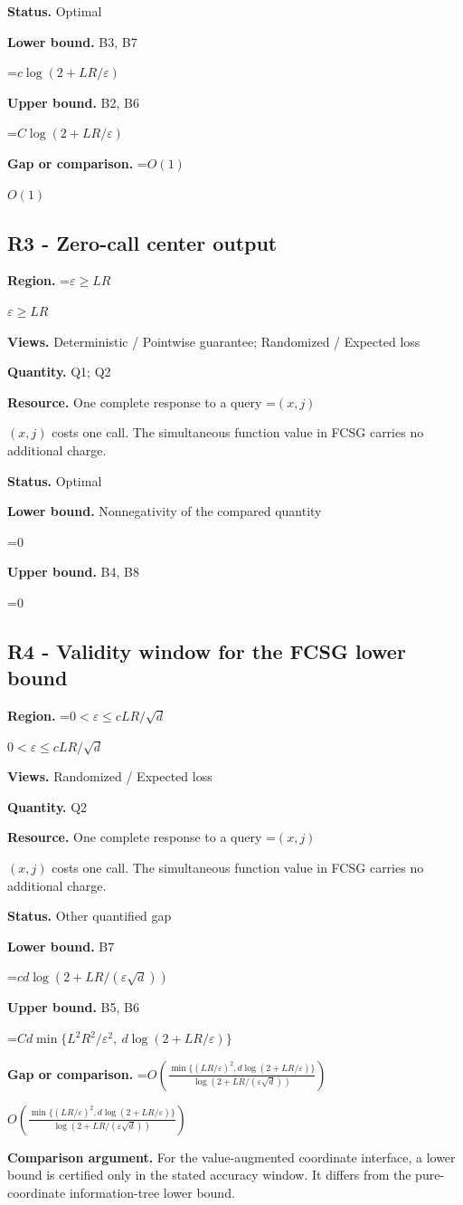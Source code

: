 \documentclass[10pt,a4paper]{article}
\newcommand{\AtlasMath}[1]{\par\begingroup\centering\setbox0=\hbox{$\displaystyle #1$}\ifdim\wd0>1.4\linewidth\typeout{ATLAS WIDE FORMULA: \the\wd0}\fi\ifdim\wd0>\linewidth\resizebox{\linewidth}{!}{\box0}\else\box0\fi\par\endgroup}
\newcommand{\AtlasInlineMath}[1]{\begingroup\setbox0=\hbox{$#1$}\ifdim\wd0>.4\linewidth\endgroup\AtlasMath{#1}\else\endgroup$#1$\fi}
\begin{document}
\textbf{Status.} Optimal

\textbf{Lower bound.} B3, B7

\AtlasMath{c\log(2+LR/\varepsilon)}
\textbf{Upper bound.} B2, B6

\AtlasMath{C\log(2+LR/\varepsilon)}
\textbf{Gap or comparison.} \AtlasInlineMath{O(1)}

\subsection{R3 - Zero-call center output}
\textbf{Region.} \AtlasInlineMath{\varepsilon\ge LR}

\textbf{Views.} Deterministic / Pointwise guarantee; Randomized / Expected loss

\textbf{Quantity.} Q1; Q2

\textbf{Resource.} One complete response to a query \AtlasInlineMath{(x,j)} costs one call. The simultaneous function value in FCSG carries no additional charge.

\textbf{Status.} Optimal

\textbf{Lower bound.} Nonnegativity of the compared quantity

\AtlasMath{0}
\textbf{Upper bound.} B4, B8

\AtlasMath{0}
\subsection{R4 - Validity window for the FCSG lower bound}
\textbf{Region.} \AtlasInlineMath{0<\varepsilon\le cLR/\sqrt d}

\textbf{Views.} Randomized / Expected loss

\textbf{Quantity.} Q2

\textbf{Resource.} One complete response to a query \AtlasInlineMath{(x,j)} costs one call. The simultaneous function value in FCSG carries no additional charge.

\textbf{Status.} Other quantified gap

\textbf{Lower bound.} B7

\AtlasMath{cd\log(2+LR/(\varepsilon\sqrt d))}
\textbf{Upper bound.} B5, B6

\AtlasMath{Cd\min\{L^2R^2/\varepsilon^2,\ d\log(2+LR/\varepsilon)\}}
\textbf{Gap or comparison.} \AtlasInlineMath{O\!\left(\frac{\min\{(LR/\varepsilon)^2,d\log(2+LR/\varepsilon)\}}{\log(2+LR/(\varepsilon\sqrt d))}\right)}

\textbf{Comparison argument.} For the value-augmented coordinate interface, a lower bound is certified only in the stated accuracy window. It differs from the pure-coordinate information-tree lower bound.
\end{document}
